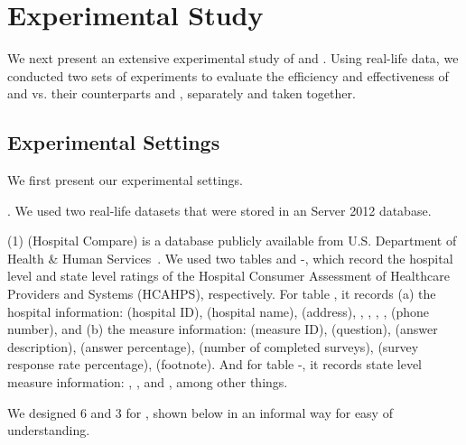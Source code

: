 



\section{Experimental Study}
\label{sec-exp}

We next present an extensive experimental study of \pCFDs and \pCINDs. Using real-life data, we conducted two sets of experiments to evaluate the efficiency and effectiveness of \pCFDs and \pCINDs vs. their counterparts \CFDs and \CINDs, separately and taken together.

\vspace{-1ex}
\subsection{Experimental Settings}
We first present our experimental settings.

. We used two real-life datasets that were stored in an \SQL Server 2012 database.

\ni(1) \hosp (Hospital Compare) is a database publicly available from U.S. Department of Health %
\& Human Services~\cite{hosp}. We used two tables  and -, which record the hospital level and state level ratings of the Hospital Consumer Assessment of Healthcare Providers and Systems (HCAHPS), respectively.
%
For table , it records (a) the hospital information:  (hospital ID),  (hospital name),  (address), , , , ,  (phone number), and (b) the measure information:  (measure ID),  (question),  (answer description),  (answer percentage),  (number of completed surveys),  (survey response rate percentage),  (footnote).
%
And for table -, it records state level measure information: , ,  and , among other things.


We designed 6 \pCFDs and 3 \pCINDs for \hosp, shown below in an informal way for easy of understanding.

